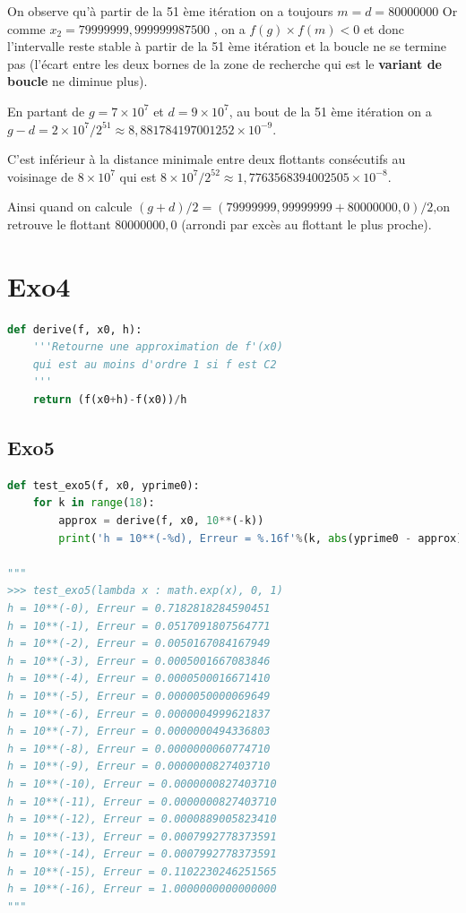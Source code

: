 \documentclass[
  11pt,
]{article}
\newcounter{exo}
\newcounter{def}
\begin{document}
On observe qu'à partir de la 51 ème itération on a toujours
\(m = d = 80000000\) Or comme \(x_{2} = 79999999,999999987500\) , on a
\(f(g) \times f(m) < 0\) et donc l'intervalle reste stable à partir de
la 51 ème itération et la boucle ne se termine pas (l'écart entre les
deux bornes de la zone de recherche qui est le \textbf{variant de
boucle} ne diminue plus).

En partant de \(g=7 \times 10^7\) et \(d=9\times 10^7\), au bout de la
51 ème itération on a
\(g-d= 2\times 10^7/2^{51} \approx 8,881784197001252 \times 10^{-9}\).

C'est inférieur à la distance minimale entre deux flottants consécutifs
au voisinage de \(8 \times 10^{7}\) qui est
\(8 \times 10^{7}/2^{52}\approx 1,7763568394002505\times 10^{-8}\).

Ainsi quand on calcule \((g + d)/2=(79999999,99999999+80000000,0)/2\),on
retrouve le flottant \(80000000,0\) (arrondi par excès au flottant le
plus proche).

\hypertarget{exo4}{%
\section{Exo4}\label{exo4}}

\begin{lstlisting}[language=Python]
def derive(f, x0, h):
    '''Retourne une approximation de f'(x0) 
    qui est au moins d'ordre 1 si f est C2
    '''
    return (f(x0+h)-f(x0))/h
\end{lstlisting}

\hypertarget{exo5}{%
\subsection{Exo5}\label{exo5}}

\begin{lstlisting}[language=Python]
def test_exo5(f, x0, yprime0):
    for k in range(18):
        approx = derive(f, x0, 10**(-k))
        print('h = 10**(-%d), Erreur = %.16f'%(k, abs(yprime0 - approx)))

"""
>>> test_exo5(lambda x : math.exp(x), 0, 1)
h = 10**(-0), Erreur = 0.7182818284590451
h = 10**(-1), Erreur = 0.0517091807564771
h = 10**(-2), Erreur = 0.0050167084167949
h = 10**(-3), Erreur = 0.0005001667083846
h = 10**(-4), Erreur = 0.0000500016671410
h = 10**(-5), Erreur = 0.0000050000069649
h = 10**(-6), Erreur = 0.0000004999621837
h = 10**(-7), Erreur = 0.0000000494336803
h = 10**(-8), Erreur = 0.0000000060774710
h = 10**(-9), Erreur = 0.0000000827403710
h = 10**(-10), Erreur = 0.0000000827403710
h = 10**(-11), Erreur = 0.0000000827403710
h = 10**(-12), Erreur = 0.0000889005823410
h = 10**(-13), Erreur = 0.0007992778373591
h = 10**(-14), Erreur = 0.0007992778373591
h = 10**(-15), Erreur = 0.1102230246251565
h = 10**(-16), Erreur = 1.0000000000000000
"""
\end{lstlisting}
\end{document}
